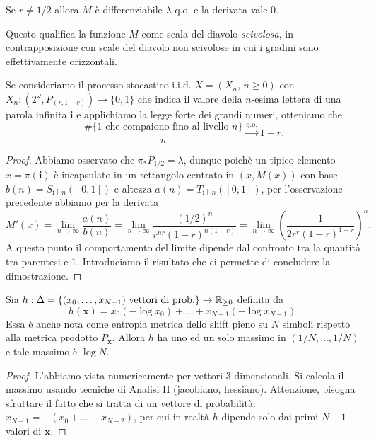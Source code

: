 \begin{teorema}
	Se $r\neq1/2$ allora $M$ è differenziabile $\lambda$-q.o. e la derivata vale 0. 
\end{teorema}
\begin{osservazione}
	Questo qualifica la funzione $M$ come scala del diavolo \emph{scivolosa}, in contrapposizione con scale del diavolo non scivolose in cui i gradini sono effettivamente orizzontali.
\end{osservazione}
\begin{osservazione}
	Se consideriamo il processo stocastico i.i.d. $X = (X_{n},\,n\geq0)$ con $X_{n}:(2^{\omega}, P_{(r,1-r)})\to\{0,1\}$ che indica il valore della $n$-esima lettera di una parola infinita $\mathbf i$ e applichiamo la legge forte dei grandi numeri, otteniamo che 
	$$\frac{\#\{\text{1 che compaiono fino al livello $n$}\}}{n} \xrightarrow{\text{q.o.}} 1-r.$$
\end{osservazione}
\begin{proof}
	Abbiamo osservato che $\pi_{*}P_{1/2} = \lambda$, dunque poichè un tipico elemento $x = \pi(\mathbf i)$ è incapsulato in un rettangolo centrato in $(x, M(x))$ con base $b(n) = S_{\mathbf i\upharpoonright n}([0,1])$ e altezza $a(n) = T_{\mathbf i\upharpoonright n}([0,1])$, per l'osservazione precedente abbiamo per la derivata 
	$$M'(x) = \lim_{n\to\infty}\frac{a(n)}{b(n)} = \lim_{n\to\infty}\frac{(1/2)^{n}}{r^{nr}(1-r)^{n(1-r)}} = 
	\lim_{n\to\infty}\left(\frac{1}{2r^{r}(1-r)^{1-r}}\right)^{n}.$$
	A questo punto il comportamento del limite dipende dal confronto tra la quantità tra parentesi e 1. 
	Introduciamo il risultato che ci permette di concludere la dimostrazione.
\end{proof}

\begin{teorema}
	Sia $h:\Delta = \{(x_{0},\dots,x_{N-1})\text{ vettori di prob.}\}\to\mathbb{R}_{\geq0}$ definita da 
	$$h(\mathbf x) = x_{0}(-\log x_{0}) + \dots + x_{N-1}(-\log x_{N-1}).$$
	Essa è anche nota come entropia metrica dello shift pieno su $N$ simboli rispetto alla metrica prodotto $P_{\mathbf x}$.
	Allora $h$ ha uno ed un solo massimo in $(1/N,\dots,1/N)$ e tale massimo è $\log N$.
\end{teorema}
\begin{proof}
	L'abbiamo vista numericamente per vettori 3-dimensionali. Si calcola il massimo usando tecniche di Analisi II (jacobiano, hessiano). Attenzione, bisogna sfruttare il fatto che si tratta di un vettore di probabilità: $x_{N-1} = -(x_{0}+\dots + x_{N-2})$, per cui in realtà $h$ dipende solo dai primi $N-1$ valori di $\mathbf x$.
\end{proof}

